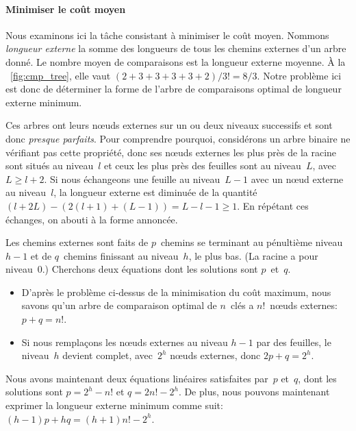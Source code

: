 \paragraph{Minimiser le coût moyen}
\label{par:opt_sort_minimean}

Nous examinons ici la tâche consistant à minimiser le coût
moyen. Nommons \emph{longueur
  externe}\label{sorting__external_path_length}  la somme des longueurs de tous les chemins
externes d'un arbre donné. Le nombre moyen de comparaisons est la
longueur externe moyenne. À la \fig~\vref{fig:cmp_tree}, elle vaut
\((2+3+3+3+3+2)/3!=8/3\). Notre problème ici est donc de déterminer la
forme de l'arbre de comparaisons optimal de longueur externe minimum.

Ces arbres ont leurs n{\oe}uds externes sur un ou deux niveaux
successifs et sont donc \emph{presque parfaits}. Pour comprendre pourquoi,
considérons un arbre binaire ne vérifiant pas cette propriété, donc
ses n{\oe}uds externes les plus près de la racine sont situés au
niveau~\(l\) et ceux les plus près des feuilles sont au niveau~\(L\),
avec \(L \geqslant l + 2\). Si nous échangeons une feuille au
niveau~\(L-1\) avec un n{\oe}ud externe au niveau~\(l\), la longueur
externe est diminuée de la quantité \((l+2L) - (2(l+1) + (L-1)) = L -
l - 1 \geqslant 1\). En répétant ces échanges, on abouti à la forme
annoncée.

Les chemins externes sont faits de \(p\)~chemins se terminant au
pénultième niveau~\(h-1\) et de \(q\)~chemins finissant au
niveau~\(h\), le plus bas. (La racine a pour niveau~\(0\).) Cherchons
deux équations dont les solutions sont \(p\)~et~\(q\).
\begin{itemize}

  \item D'après le problème ci-dessus de la minimisation du coût
    maximum, nous savons qu'un arbre de comparaison optimal de
    \(n\)~clés a \(n!\)~n{\oe}uds externes: \(p+q=n!\).

  \item Si nous remplaçons les n{\oe}uds externes au niveau \(h-1\)
    par des feuilles, le niveau~\(h\) devient complet, avec~\(2^h\)
    n{\oe}uds externes, donc \(2p+q=2^h\).

\end{itemize}
Nous avons maintenant deux équations linéaires satisfaites par~\(p\)
et~\(q\), dont les solutions sont \(p=2^h-n!\) et \(q=2n!-2^h\). De
plus, nous pouvons maintenant exprimer la longueur externe minimum
comme suit: \((h-1)p + hq = (h+1)n! - 2^h\).

